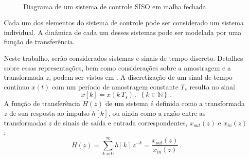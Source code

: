 \documentclass[repeatfields,oneside,overleaf]{tcc}
\newcommand{\mycdot}{ \, }
\begin{document}
\begin{figure}[h]
    \centering
    \caption{Diagrama de um sistema de controle SISO em malha fechada.}
    \\
    \label{fig:control}
\end{figure}

Cada um dos elementos do sistema de controle pode ser considerado um sistema individual.
A dinâmica de cada um desses sistemas pode ser modelada por uma função de transferência.

Neste trabalho, serão considerados sistemas e sinais de tempo discreto.
Detalhes sobre essas representações, bem como considerações sobre a amostragem e a transformada $z$, podem ser vistos em \cite{Haykin2001, Astrom2011, Dorf2011}.
%
A discretização de um sinal de tempo contínuo $x(t)$ com um período de amostragem constante $T_s$ resulta no sinal
\begin{equation}\label{eq:sampling}
    x[k] = x(k \mycdot T_s)
    \,,\;
    \left\{ k \in \mathbb{N} \right\}
    \,.
\end{equation}
A função de transferência $H(z)$ de um sistema é definida como a transformada $z$ de sua resposta ao impulso $h[k]$, ou ainda como a razão entre as transformadas $z$ de sinais de saída e entrada correspondentes, $x_{out}(z)$ e $x_{in}(z)$:
\begin{equation}\label{eq:transfer_function}
    H(z) = \sum_{k = 0}^{\infty} h[k] \mycdot z^{-k}
         = \dfrac{ x_{out}(z) }{ x_{in}(z) }
    \,.
\end{equation}
\end{document}
